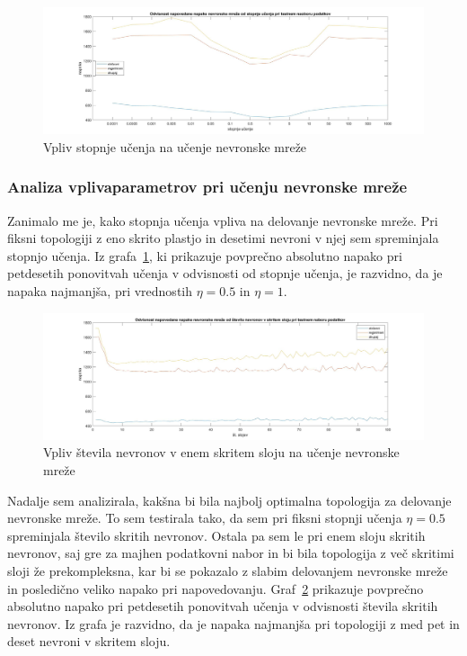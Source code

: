 \documentclass[mat1]{fmfdelo}
\begin{document}
\begin{figure}[!h]
	\centering
	\includegraphics[width=1\textwidth]{rate.jpg}
	\caption{Vpliv stopnje učenja na učenje nevronske mreže}
	\label{fig:rate}
\end{figure}

\subsubsection{Analiza vplivaparametrov pri učenju nevronske mreže}
Zanimalo me je, kako stopnja učenja vpliva na delovanje nevronske mreže. Pri fiksni topologiji z eno skrito plastjo in desetimi nevroni v njej sem spreminjala stopnjo učenja. Iz grafa~\ref{fig:rate}, ki prikazuje povprečno absolutno napako pri petdesetih ponovitvah učenja v odvisnosti od stopnje učenja, je razvidno, da je napaka najmanjša, pri vrednostih $\eta = 0.5$ in $\eta = 1$.

\begin{figure}[!ht]
	\centering
	\includegraphics[width=1\textwidth]{lay.jpg}
	\caption{Vpliv števila nevronov v enem skritem sloju na učenje nevronske mreže}
	\label{fig:lay}
\end{figure}
Nadalje sem analizirala, kakšna bi bila najbolj optimalna topologija za delovanje nevronske mreže. To sem testirala tako, da sem pri fiksni stopnji učenja $\eta = 0.5$ spreminjala število skritih nevronov. Ostala pa sem le pri enem sloju skritih nevronov, saj gre za majhen podatkovni nabor in bi bila topologija z več skritimi sloji že prekompleksna, kar bi se pokazalo z slabim delovanjem nevronske mreže in posledično veliko napako pri napovedovanju. 
Graf~\ref{fig:lay} prikazuje povprečno absolutno napako pri petdesetih ponovitvah učenja v odvisnosti števila skritih nevronov. Iz grafa je razvidno, da je napaka najmanjša pri topologiji z med pet in deset nevroni v skritem sloju.
\end{document}
